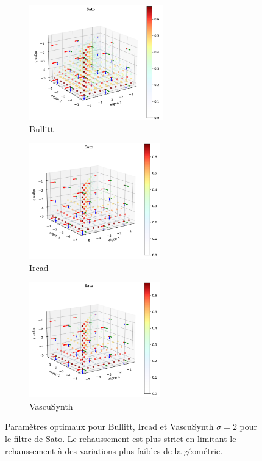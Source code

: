 \begin{figure}[H]
  \centering
  \begin{subfigure}[t]{0.45\textwidth}
    \includegraphics[height=5cm]{Images/Bullitt_Sato_BP.png}
    \caption{Bullitt}
  \end{subfigure}
  \begin{subfigure}[t]{0.45\textwidth}
    \includegraphics[height=5cm]{Images/Ircad_Sato_BP.png}
    \caption{Ircad}
  \end{subfigure}
  
  \begin{subfigure}[t]{0.45\textwidth}
    \includegraphics[height=5cm]{Images/Ircad_Sato_BP.png}
    \caption{VascuSynth}
  \end{subfigure}
  \caption{Paramètres optimaux pour Bullitt, Ircad et VascuSynth $\sigma=2$ pour le filtre de Sato. Le rehaussement est plus strict en limitant le rehaussement à des variations plus faibles de la géométrie.}
  \label{fig:exemple_geometry_Sato}
\end{figure}

